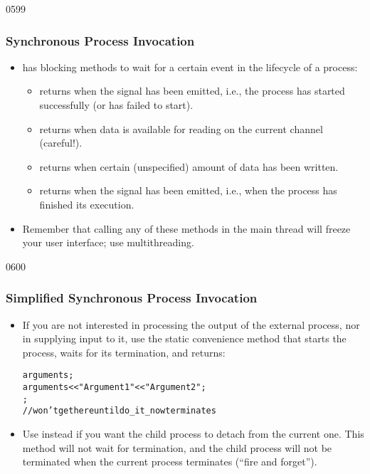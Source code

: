 \begin{slide}{0599}
\frametitle{Synchronous Process Invocation}
\begin{itemize}
\item {} has blocking methods to wait for a certain
event in the lifecycle of a process:
\begin{itemize}
        \item {} returns when the
         signal has been emitted, i.e., the process has
                started successfully (or has failed to start).
        \item {} returns when data is
                available for reading on the current channel (careful!).
        \item {} returns when certain
                (unspecified) amount of data has been written.
        \item {} returns when the
                 signal has been emitted, i.e., when the process has
                finished its execution.
\end{itemize}
\item Remember that calling any of these methods in the main thread
will freeze your user interface; use multithreading.
\end{itemize}
\end{slide}

\begin{slide}[fragile]{0600}
\frametitle{Simplified Synchronous Process Invocation}
  \begin{itemize}
\item If you are not interested in processing the output of the
external process, nor in supplying input to it, use the static
convenience method  that starts the
process, waits for its termination, and returns:
\begin{alltt}
 arguments;
arguments << "Argument1" << "Argument2";
;
// won't get here until do_it_now terminates
\end{alltt}
\item Use  instead if you want the child
process to detach from the current one. This method will not wait for
termination, and the child process will not be terminated
when the current process terminates (``fire and forget'').
  \end{itemize}
\end{slide}
